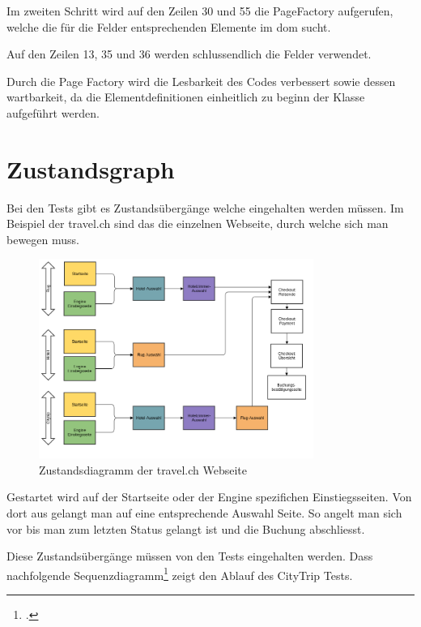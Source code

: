 Im zweiten Schritt wird auf den Zeilen 30 und 55 die PageFactory aufgerufen, welche die für die Felder entsprechenden Elemente im \gls{dom} sucht.

Auf den Zeilen 13, 35 und 36 werden schlussendlich die Felder verwendet.

Durch die Page Factory wird die Lesbarkeit des Codes verbessert sowie dessen wartbarkeit, da die Elementdefinitionen einheitlich zu beginn der Klasse aufgeführt werden.

\section{Zustandsgraph}
\label{sec:umsetzung:zustandsgraph}
Bei den Tests gibt es Zustandsübergänge welche eingehalten werden müssen. Im Beispiel der travel.ch sind das die einzelnen Webseite, durch welche sich man bewegen muss. 

\begin{figure}[H]
	\centering
	\includegraphics[width=0.8\textwidth]{images/Automated Testing Ablauf2.png}
	\caption{Zustandsdiagramm der travel.ch Webseite}
	\label{fig:umsetzung:zustandsgraph}
\end{figure}

Gestartet wird auf der Startseite oder der Engine spezifichen Einstiegsseiten. Von dort aus gelangt man auf eine entsprechende Auswahl Seite. So angelt man sich vor bis man zum letzten Status gelangt ist und die Buchung abschliesst.

Diese Zustandsübergänge müssen von den Tests eingehalten werden. Dass nachfolgende Sequenzdiagramm\footcite{sequence_diagram} zeigt den Ablauf des CityTrip Tests.

